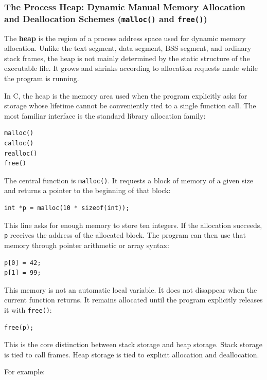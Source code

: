 \subsubsection{The Process Heap: Dynamic Manual Memory Allocation and Deallocation Schemes (\texttt{malloc()} and \texttt{free()})}

The \textbf{heap} is the region of a process address space used for dynamic memory allocation. Unlike the text segment, data segment, BSS segment, and ordinary stack frames, the heap is not mainly determined by the static structure of the executable file. It grows and shrinks according to allocation requests made while the program is running.

In C, the heap is the memory area used when the program explicitly asks for storage whose lifetime cannot be conveniently tied to a single function call. The most familiar interface is the standard library allocation family:

\begin{verbatim}
malloc()
calloc()
realloc()
free()
\end{verbatim}

The central function is \texttt{malloc()}. It requests a block of memory of a given size and returns a pointer to the beginning of that block:

\begin{verbatim}
int *p = malloc(10 * sizeof(int));
\end{verbatim}

This line asks for enough memory to store ten integers. If the allocation succeeds, \texttt{p} receives the address of the allocated block. The program can then use that memory through pointer arithmetic or array syntax:

\begin{verbatim}
p[0] = 42;
p[1] = 99;
\end{verbatim}

This memory is not an automatic local variable. It does not disappear when the current function returns. It remains allocated until the program explicitly releases it with \texttt{free()}:

\begin{verbatim}
free(p);
\end{verbatim}

This is the core distinction between stack storage and heap storage. Stack storage is tied to call frames. Heap storage is tied to explicit allocation and deallocation.

For example:

